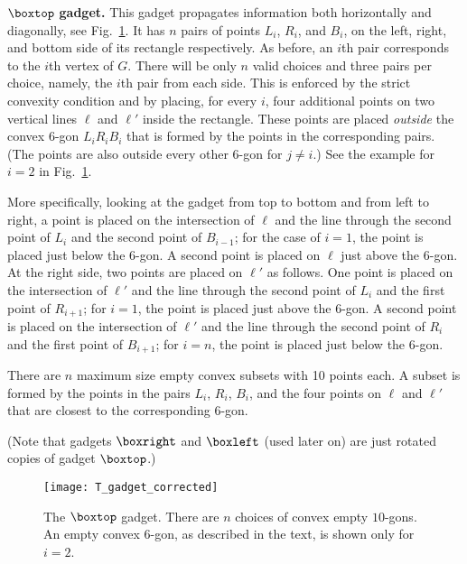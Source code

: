 \documentclass[11pt,a4paper]{article}
\begin{document}
\medskip
\noindent
{$\boxtop$ \textbf{gadget.}} This gadget propagates information both horizontally and diagonally, see Fig.~\ref{fig:T_gadget}. It has $n$ pairs of points $L_i$, $R_i$, and $B_i$, on the left, right, and bottom side of its rectangle respectively. As before, an $i$th pair corresponds to the $i$th vertex of $G$. There will be only $n$ valid choices and three pairs per choice, namely, the $i$th pair from each side. This is enforced by the strict convexity condition and by placing, for every $i$, four additional points on two vertical lines $\ell$ and $\ell'$ inside the rectangle. These points are placed \emph{outside} the convex $6$-gon $L_iR_iB_i$ that is formed by the points in the corresponding pairs. (The points are also outside every other $6$-gon for $j\neq i$.) See the example for $i=2$ in Fig.~\ref{fig:T_gadget}. 

More specifically, looking at the gadget from top to bottom and from left to right, a point is placed on the intersection of $\ell$ and the line through the second point of $L_i$ and the second point of $B_{i-1}$; for the case of $i=1$, the point is placed just below the $6$-gon. A second point is placed on $\ell$ just above the $6$-gon. At the right side, two points are placed on $\ell'$ as follows. One point is placed on the intersection of $\ell'$ and the line through the second point of $L_i$ and the first point of $R_{i+1}$; for $i=1$, the point is placed just above the $6$-gon. A second point is placed on the intersection of $\ell'$ and the line through the second point of $R_i$ and the first point of $B_{i+1}$; for $i=n$, the point is placed just below the $6$-gon.

There are $n$ maximum size empty convex subsets with 10 points each. A subset is formed by the points in the pairs $L_i$, $R_i$, $B_i$, and the four points on $\ell$ and $\ell'$ that are closest to the corresponding $6$-gon. 

(Note that gadgets $\boxright$ and $\boxleft$ (used later on) are just rotated copies of gadget $\boxtop$.)
\begin{figure}
\centering
	\texttt{[image: T\_gadget\_corrected]}
	\caption{The $\boxtop$ gadget. There are $n$ choices of convex empty $10$-gons. An empty convex $6$-gon, as described in the text, is shown only for $i=2$.}
	\label{fig:T_gadget}
\end{figure}
\end{document}
